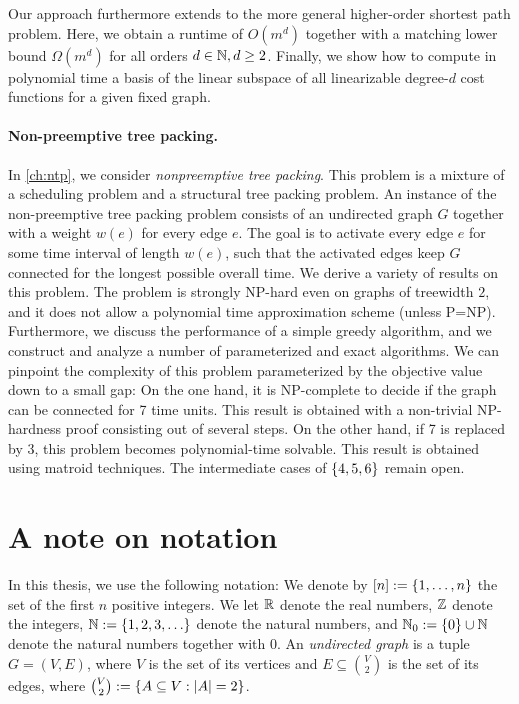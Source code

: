 Our approach furthermore extends to the more general higher-order shortest path problem. Here, we obtain a runtime of $O(m^d)$ together with a matching lower bound $\Omega(m^d)$ for all orders $d \in \mathbb{N}, d \geq 2$. 
Finally, we show how to compute in polynomial time a basis of the linear subspace of all linearizable degree-$d$ cost functions for a given fixed graph.

\paragraph*{Non-preemptive tree packing.}
In \cref{ch:ntp}, we consider \emph{nonpreemptive tree packing}. This problem is a mixture of a scheduling problem and a structural tree packing problem.
An instance of the non-preemptive tree packing problem consists of an undirected graph $G$ together with a weight $w(e)$ for every edge $e$. The goal is to activate every edge $e$ for some time interval of length $w(e)$, such that the activated edges keep $G$ connected for the longest possible overall time. We derive a variety of results on this problem. The problem is strongly NP-hard even on graphs of treewidth $2$, and it does not allow a polynomial time approximation scheme (unless P=NP). Furthermore, we discuss the performance of a simple greedy algorithm, and we construct and analyze a number of parameterized and exact algorithms.
We can pinpoint the complexity of this problem parameterized by the objective value down to a small gap: On the one hand, it is NP-complete to decide if the graph can be connected for 7 time units. This result is obtained with a non-trivial NP-hardness proof consisting out of several steps. On the other hand, if 7 is replaced by 3, this problem becomes polynomial-time solvable. This result is obtained using matroid techniques. The intermediate cases of $\{ 4,5,6 \}$ remain open.

\section{A note on notation}

In this thesis, we use the following notation: We denote by $[n] := \{ 1, \ldots, n \}$ the set of the first $n$ positive integers. We let $\mathbb{R}$ denote the real numbers, $\mathbb{Z}$ denote the integers, $\N := \set{1,2,3,\dots}$ denote the natural numbers, and $\mathbb{N}_0 := \{ 0 \} \cup \mathbb{N}$ denote the natural numbers together with 0. 
An \emph{undirected graph} is a tuple $G = (V,E)$, where $V$ is the set of its vertices and $E \subseteq \binom{V}{2}$ is the set of its edges, where $\binom{V}{2} := \{ A \subseteq V : |A| = 2 \}$.

